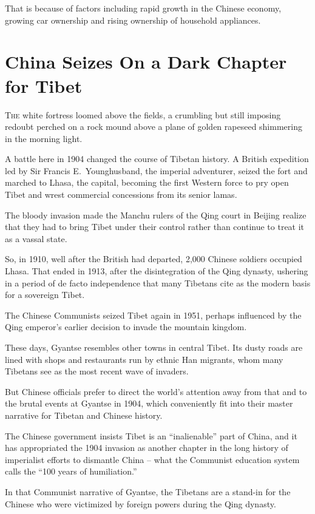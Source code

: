 ﻿\documentclass[12pt]{article}
\begin{document}
That is because of factors including rapid growth in the Chinese economy, growing car ownership and
rising ownership of household appliances.


\section{China Seizes On a Dark Chapter for Tibet}

\lettrine{T}{he} white fortress loomed above the fields, a crumbling but
still imposing redoubt perched on a rock mound above a plane of golden rapeseed shimmering in the
morning light.

A battle here in 1904 changed the course of Tibetan history. A British expedition led by Sir Francis
E.~Younghusband, the imperial adventurer, seized the fort and marched to Lhasa, the capital,
becoming the first Western force to pry open Tibet and wrest commercial concessions from its senior
lamas.

The bloody invasion made the Manchu rulers of the Qing court in Beijing realize that they had to
bring Tibet under their control rather than continue to treat it as a vassal state.

So, in 1910, well after the British had departed, 2,000 Chinese soldiers occupied Lhasa. That ended
in 1913, after the disintegration of the Qing dynasty, ushering in a period of de facto independence
that many Tibetans cite as the modern basis for a sovereign Tibet.

The Chinese Communists seized Tibet again in 1951, perhaps influenced by the Qing emperor's earlier
decision to invade the mountain kingdom.

These days, Gyantse resembles other towns in central Tibet. Its dusty roads are lined with shops and
restaurants run by ethnic Han migrants, whom many Tibetans see as the most recent wave of invaders.

But Chinese officials prefer to direct the world's attention away from that and to the brutal events
at Gyantse in 1904, which conveniently fit into their master narrative for Tibetan and Chinese
history.

The Chinese government insists Tibet is an ``inalienable'' part of China, and it has appropriated
the 1904 invasion as another chapter in the long history of imperialist efforts to dismantle China
-- what the Communist education system calls the ``100 years of humiliation.''

In that Communist narrative of Gyantse, the Tibetans are a stand-in for the Chinese who were
victimized by foreign powers during the Qing dynasty.
\end{document}
